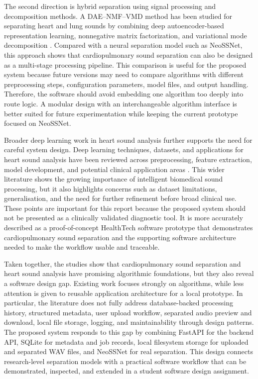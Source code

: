 The second direction is hybrid separation using signal processing and decomposition methods. A DAE--NMF--VMD method has been studied for separating heart and lung sounds by combining deep autoencoder-based representation learning, nonnegative matrix factorization, and variational mode decomposition \parencite{sun2024daenmfvmd}. Compared with a neural separation model such as NeoSSNet, this approach shows that cardiopulmonary sound separation can also be designed as a multi-stage processing pipeline. This comparison is useful for the proposed system because future versions may need to compare algorithms with different preprocessing steps, configuration parameters, model files, and output handling. Therefore, the software should avoid embedding one algorithm too deeply into route logic. A modular design with an interchangeable algorithm interface is better suited for future experimentation while keeping the current prototype focused on NeoSSNet.

Broader deep learning work in heart sound analysis further supports the need for careful system design. Deep learning techniques, datasets, and applications for heart sound analysis have been reviewed across preprocessing, feature extraction, model development, and potential clinical application areas \parencite{zhao2024heartanalysis}. This wider literature shows the growing importance of intelligent biomedical sound processing, but it also highlights concerns such as dataset limitations, generalisation, and the need for further refinement before broad clinical use. These points are important for this report because the proposed system should not be presented as a clinically validated diagnostic tool. It is more accurately described as a proof-of-concept HealthTech software prototype that demonstrates cardiopulmonary sound separation and the supporting software architecture needed to make the workflow usable and traceable.

Taken together, the studies show that cardiopulmonary sound separation and heart sound analysis have promising algorithmic foundations, but they also reveal a software design gap. Existing work focuses strongly on algorithms, while less attention is given to reusable application architecture for a local prototype. In particular, the literature does not fully address database-backed processing history, structured metadata, user upload workflow, separated audio preview and download, local file storage, logging, and maintainability through design patterns. The proposed system responds to this gap by combining FastAPI for the backend API, SQLite for metadata and job records, local filesystem storage for uploaded and separated WAV files, and NeoSSNet for real separation. This design connects research-level separation models with a practical software workflow that can be demonstrated, inspected, and extended in a student software design assignment.

